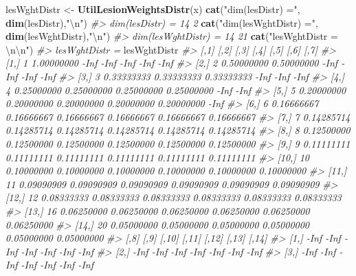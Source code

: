 \documentclass[]{book}
\newenvironment{Shaded}{\begin{snugshade}}{\end{snugshade}}
\newcommand{\CharTok}[1]{\textcolor[rgb]{0.31,0.60,0.02}{#1}}
\newcommand{\CommentTok}[1]{\textcolor[rgb]{0.56,0.35,0.01}{\textit{#1}}}
\newcommand{\KeywordTok}[1]{\textcolor[rgb]{0.13,0.29,0.53}{\textbf{#1}}}
\newcommand{\NormalTok}[1]{#1}
\newcommand{\StringTok}[1]{\textcolor[rgb]{0.31,0.60,0.02}{#1}}
\begin{document}
\begin{Shaded}
\begin{Highlighting}[]
\NormalTok{lesWghtDistr <-}\StringTok{ }\KeywordTok{UtilLesionWeightsDistr}\NormalTok{(x)}
\KeywordTok{cat}\NormalTok{(}\StringTok{"dim(lesDistr) ="}\NormalTok{, }\KeywordTok{dim}\NormalTok{(lesDistr),}\StringTok{"}\CharTok{\textbackslash{}n}\StringTok{"}\NormalTok{)}
\CommentTok{#> dim(lesDistr) = 14 2}
\KeywordTok{cat}\NormalTok{(}\StringTok{"dim(lesWghtDistr) ="}\NormalTok{, }\KeywordTok{dim}\NormalTok{(lesWghtDistr),}\StringTok{"}\CharTok{\textbackslash{}n}\StringTok{"}\NormalTok{)}
\CommentTok{#> dim(lesWghtDistr) = 14 21}
\KeywordTok{cat}\NormalTok{(}\StringTok{"lesWghtDistr = }\CharTok{\textbackslash{}n\textbackslash{}n}\StringTok{"}\NormalTok{)}
\CommentTok{#> lesWghtDistr =}
\NormalTok{lesWghtDistr}
\CommentTok{#>       [,1]       [,2]       [,3]       [,4]       [,5]       [,6]       [,7]}
\CommentTok{#>  [1,]    1 1.00000000       -Inf       -Inf       -Inf       -Inf       -Inf}
\CommentTok{#>  [2,]    2 0.50000000 0.50000000       -Inf       -Inf       -Inf       -Inf}
\CommentTok{#>  [3,]    3 0.33333333 0.33333333 0.33333333       -Inf       -Inf       -Inf}
\CommentTok{#>  [4,]    4 0.25000000 0.25000000 0.25000000 0.25000000       -Inf       -Inf}
\CommentTok{#>  [5,]    5 0.20000000 0.20000000 0.20000000 0.20000000 0.20000000       -Inf}
\CommentTok{#>  [6,]    6 0.16666667 0.16666667 0.16666667 0.16666667 0.16666667 0.16666667}
\CommentTok{#>  [7,]    7 0.14285714 0.14285714 0.14285714 0.14285714 0.14285714 0.14285714}
\CommentTok{#>  [8,]    8 0.12500000 0.12500000 0.12500000 0.12500000 0.12500000 0.12500000}
\CommentTok{#>  [9,]    9 0.11111111 0.11111111 0.11111111 0.11111111 0.11111111 0.11111111}
\CommentTok{#> [10,]   10 0.10000000 0.10000000 0.10000000 0.10000000 0.10000000 0.10000000}
\CommentTok{#> [11,]   11 0.09090909 0.09090909 0.09090909 0.09090909 0.09090909 0.09090909}
\CommentTok{#> [12,]   12 0.08333333 0.08333333 0.08333333 0.08333333 0.08333333 0.08333333}
\CommentTok{#> [13,]   16 0.06250000 0.06250000 0.06250000 0.06250000 0.06250000 0.06250000}
\CommentTok{#> [14,]   20 0.05000000 0.05000000 0.05000000 0.05000000 0.05000000 0.05000000}
\CommentTok{#>             [,8]       [,9]      [,10]      [,11]      [,12]      [,13]  [,14]}
\CommentTok{#>  [1,]       -Inf       -Inf       -Inf       -Inf       -Inf       -Inf   -Inf}
\CommentTok{#>  [2,]       -Inf       -Inf       -Inf       -Inf       -Inf       -Inf   -Inf}
\CommentTok{#>  [3,]       -Inf       -Inf       -Inf       -Inf       -Inf       -Inf   -Inf}

\end{Highlighting}
\end{Shaded}
\end{document}
